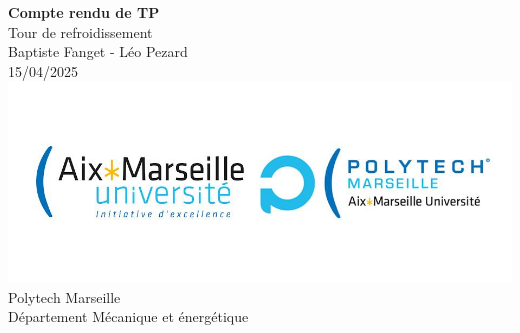 \vfill

\begin{center}
{\LARGE \textbf{Compte rendu de TP}} \\[1em]
Tour de refroidissement \\[2em]

Baptiste Fanget - Léo Pezard \\
15/04/2025 \\[4em]

\includegraphics[width=1\textwidth]{logo.jpg} \\[2em]

Polytech Marseille \\
Département Mécanique et énergétique
\end{center}

\vfill

\newpage
